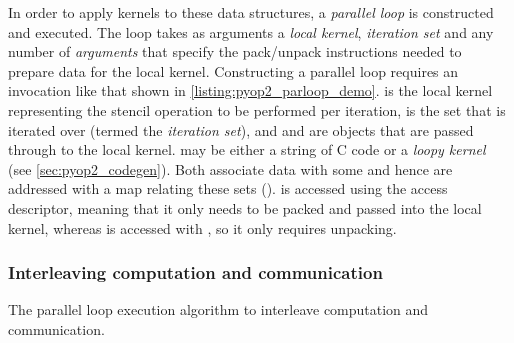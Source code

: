 \documentclass[thesis]{subfiles}
\begin{document}
In order to apply kernels to these data structures, a \emph{parallel loop} is constructed and executed.
The loop takes as arguments a \emph{local kernel}, \emph{iteration set} and any number of \emph{arguments} that specify the pack/unpack instructions needed to prepare data for the local kernel.
Constructing a parallel loop requires an invocation like that shown in \cref{listing:pyop2_parloop_demo}.
 is the local kernel representing the stencil operation to be performed per iteration,  is the set that is iterated over (termed the \emph{iteration set}), and  and  are  objects that are passed through to the local kernel.
 may be either a string of C code or a \emph{loopy kernel} (see \cref{sec:pyop2_codegen}).
Both  associate data with some  and hence are addressed with a map relating these sets ().
 is accessed using the  access descriptor, meaning that it only needs to be packed and passed into the local kernel, whereas  is accessed with , so it only requires unpacking.

\subsubsection{Interleaving computation and communication}
\label{sec:pyop2_interleave}

\begin{algorithm}
  \caption{The  parallel loop execution algorithm to interleave computation and communication.}
  \begin{algorithmic}[1]
    \State {} 

     
      \State {}
    \EndFor

    \State {} 

     
      \State {}
    \EndFor
  \end{algorithmic}
  \label{alg:pyop2_comp_comm_overlap}
\end{algorithm}
\end{document}
